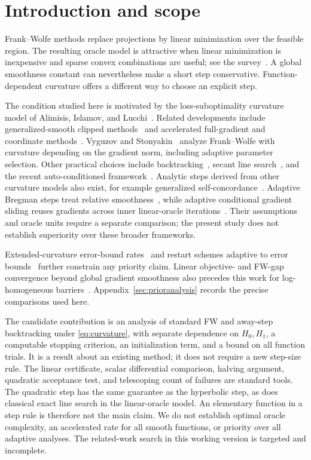 \documentclass[11pt]{article}
\begin{document}
\section{Introduction and scope}
Frank--Wolfe methods replace projections by linear minimization over the
feasible region. The resulting oracle model is attractive when linear
minimization is inexpensive and sparse convex combinations are useful;
see the survey~\cite{braun}. A global smoothness constant can nevertheless
make a short step conservative. Function-dependent curvature offers a
different way to choose an explicit step.

The condition studied here is motivated by the loss-suboptimality curvature
model of Alimisis, Islamov, and Lucchi~\cite{warmup}. Related developments
include generalized-smooth clipped methods~\cite{lobanovkoloskova} and
accelerated full-gradient and coordinate methods~\cite{lobanov}.
Vyguzov and Stonyakin~\cite{vyguzov} analyze Frank--Wolfe with curvature
depending on the gradient norm, including adaptive parameter selection.
Other practical choices include backtracking~\cite{pedregosa}, secant
line search~\cite{hendrych}, and the recent auto-conditioned framework~\cite{autoconditioned}.
Analytic steps derived from other curvature
models also exist, for example generalized self-concordance~\cite{selfconcordant}.
Adaptive Bregman steps treat relative smoothness~\cite{bregmanfw}, while
adaptive conditional gradient sliding reuses gradients across inner
linear-oracle iterations~\cite{adcgs}. Their assumptions and oracle units
require a separate comparison; the present study does not establish
superiority over these broader frameworks.

Extended-curvature error-bound rates~\cite{wirth} and restart schemes
adaptive to error bounds~\cite{restartfw} further constrain any priority
claim. Linear objective- and FW-gap convergence beyond global gradient
smoothness also precedes this work for log-homogeneous barriers~\cite{zhao}.
Appendix~\ref{sec:prioranalysis} records the precise comparisons used here.

The candidate contribution is an analysis of standard FW and away-step
backtracking under
\eqref{eq:curvature}, with separate dependence on $H_0,H_1$, a computable
stopping criterion, an initialization term, and a bound on all function
trials. It is a result about an existing method; it does not require a
new step-size rule. The linear certificate, scalar
differential comparison, halving argument, quadratic acceptance test, and
telescoping count of failures are standard tools. The quadratic step has
the same guarantee as the hyperbolic step, as does classical exact line
search in the linear-oracle model. An elementary function in a step rule
is therefore not the main claim. We do not establish optimal oracle
complexity, an accelerated rate for all smooth functions, or priority over
all adaptive analyses. The related-work search in this working version is
targeted and incomplete.
\end{document}
